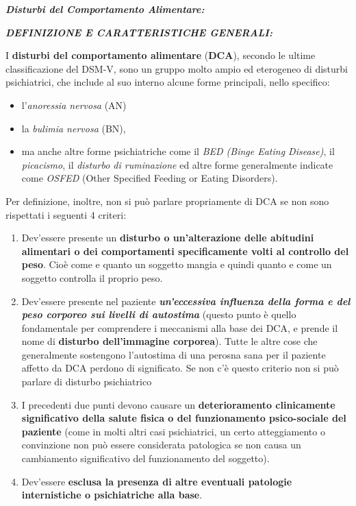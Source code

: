 \documentclass[]{article}
\date{}
\begin{document}
\textbf{\emph{Disturbi del Comportamento Alimentare:}}

\textbf{\emph{DEFINIZIONE E CARATTERISTICHE GENERALI:}}

I \textbf{disturbi del comportamento alimentare} (\textbf{DCA}), secondo
le ultime classificazione del DSM-V, sono un gruppo molto ampio ed
eterogeneo di disturbi psichiatrici, che include al suo interno alcune
forme principali, nello specifico:

\begin{itemize}
\item
  l'\emph{anoressia nervosa} (AN)
\item
  la \emph{bulimia nervosa} (BN),
\item
  ma anche altre forme psichiatriche come il \emph{BED (Binge Eating
  Disease)}, il \emph{picacismo}, il \emph{disturbo di ruminazione} ed
  altre forme generalmente indicate come \emph{OSFED} (Other Specified
  Feeding or Eating Disorders).
\end{itemize}

Per definizione, inoltre, non si può parlare propriamente di DCA se non
sono rispettati i seguenti 4 criteri:

\begin{enumerate}
\def\labelenumi{\arabic{enumi}.}
\item
  Dev'essere presente un \textbf{disturbo o un'alterazione delle
  abitudini alimentari o dei comportamenti specificamente volti al
  controllo del peso}. Cioè come e quanto un soggetto mangia e quindi
  quanto e come un soggetto controlla il proprio peso.
\item
  Dev'essere presente nel paziente \textbf{\emph{un'eccessiva influenza
  della forma e del peso corporeo sui livelli di autostima}} (questo
  punto è quello fondamentale per comprendere i meccanismi alla base dei
  DCA, e prende il nome di \textbf{disturbo dell'immagine corporea}).
  Tutte le altre cose che generalmente sostengono l'autostima di una
  perosna sana per il paziente affetto da DCA perdono di significato. Se
  non c'è questo criterio non si può parlare di disturbo psichiatrico
\item
  I precedenti due punti devono causare un \textbf{deterioramento
  clinicamente significativo della salute fisica o del funzionamento
  psico-sociale del paziente} (come in molti altri casi psichiatrici, un
  certo atteggiamento o convinzione non può essere considerata
  patologica se non causa un cambiamento significativo del funzionamento
  del soggetto).
\item
  Dev'essere \textbf{esclusa la presenza di altre eventuali patologie
  internistiche o psichiatriche alla base}.
\end{enumerate}
\end{document}
